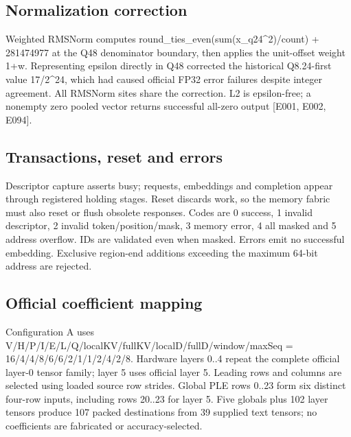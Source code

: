 \documentclass[11pt,a4paper]{article}
\begin{document}
\subsection{Normalization correction}

Weighted RMSNorm computes round\_\allowbreak{}ties\_\allowbreak{}even(\allowbreak{}sum(\allowbreak{}x\_\allowbreak{}q24\textasciicircum{}2)\allowbreak{}/\allowbreak{}count)\allowbreak{} +\allowbreak{} 281474977 at the Q48 denominator boundary,\allowbreak{} then applies the unit-offset weight 1+\allowbreak{}w. Representing epsilon directly in Q48 corrected the historical Q8.24-first value 17/\allowbreak{}2\textasciicircum{}24,\allowbreak{} which had caused official FP32 error failures despite integer agreement. All RMSNorm sites share the correction. L2 is epsilon-free; a nonempty zero pooled vector returns successful all-zero output [\allowbreak{}E001,\allowbreak{} E002,\allowbreak{} E094]\allowbreak{}.

\subsection{Transactions,\allowbreak{} reset and errors}

Descriptor capture asserts busy; requests,\allowbreak{} embeddings and completion appear through registered holding stages. Reset discards work,\allowbreak{} so the memory fabric must also reset or flush obsolete responses. Codes are 0 success,\allowbreak{} 1 invalid descriptor,\allowbreak{} 2 invalid token/\allowbreak{}position/\allowbreak{}mask,\allowbreak{} 3 memory error,\allowbreak{} 4 all masked and 5 address overflow. IDs are validated even when masked. Errors emit no successful embedding. Exclusive region-end additions exceeding the maximum 64-bit address are rejected.

\subsection{Official coefficient mapping}

Configuration A uses V/\allowbreak{}H/\allowbreak{}P/\allowbreak{}I/\allowbreak{}E/\allowbreak{}L/\allowbreak{}Q/\allowbreak{}localKV/\allowbreak{}fullKV/\allowbreak{}localD/\allowbreak{}fullD/\allowbreak{}window/\allowbreak{}maxSeq =\allowbreak{} 16/\allowbreak{}4/\allowbreak{}4/\allowbreak{}8/\allowbreak{}6/\allowbreak{}6/\allowbreak{}2/\allowbreak{}1/\allowbreak{}1/\allowbreak{}2/\allowbreak{}4/\allowbreak{}2/\allowbreak{}8. Hardware layers 0..4 repeat the complete official layer-0 tensor family; layer 5 uses official layer 5. Leading rows and columns are selected using loaded source row strides. Global PLE rows 0..23 form six distinct four-row inputs,\allowbreak{} including rows 20..23 for layer 5. Five globals plus 102 layer tensors produce 107 packed destinations from 39 supplied text tensors; no coefficients are fabricated or accuracy-selected.
\end{document}
